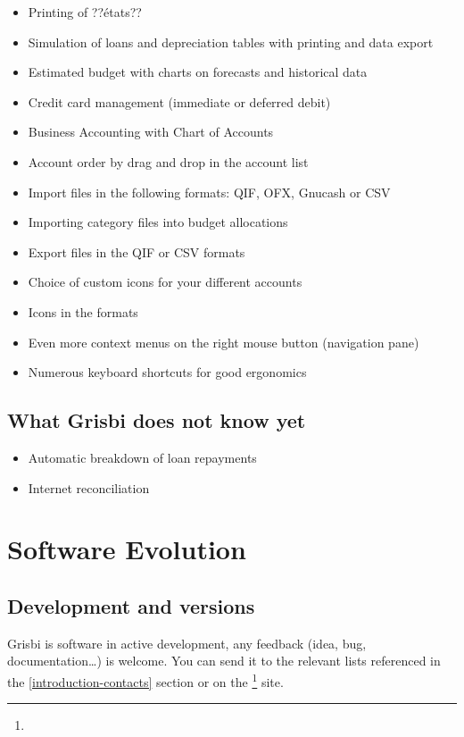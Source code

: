 \begin{itemize}
	\item Printing of  ??états??
	\item Simulation of loans and depreciation tables with printing and data export
	\item Estimated budget with charts on forecasts and historical data
	\item Credit card management (immediate or deferred debit)
	\item Business Accounting with Chart of Accounts
	\item Account order by drag and drop in the account list
	\item Import files in the following formats: \gls{QIF}, \gls{OFX}, \gls{Gnucash} or \gls{CSV}
	\item Importing category files into budget allocations
	\item Export files in the \gls{QIF} or \gls{CSV} formats
	\item Choice of custom icons for your different accounts
	\item Icons in the   formats
	\item Even more context menus on the right mouse button (navigation pane)
	\item Numerous keyboard shortcuts for good ergonomics
\end{itemize}

\subsection{What Grisbi does not know yet}

\begin{itemize}

\item Automatic breakdown of loan repayments

\item Internet reconciliation

\end{itemize}

\section{Software Evolution}

\subsection{Development and versions}

Grisbi is software in active development, any feedback (idea, bug, documentation\dots) is welcome. You can send it to the relevant lists referenced in the  \vref{introduction-contacts}  section or on the  \footnote{\urlGrisbi{}} site.


